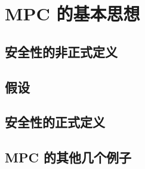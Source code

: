 \section{MPC 的基本思想}\label{sec:22-1}

\subsection{安全性的非正式定义}\label{subsec:22-1-1}

\subsection{假设}\label{subsec:22-1-2}

\subsection{安全性的正式定义}\label{subsec:22-1-3}

\subsection{MPC 的其他几个例子}\label{subsec:22-1-4}